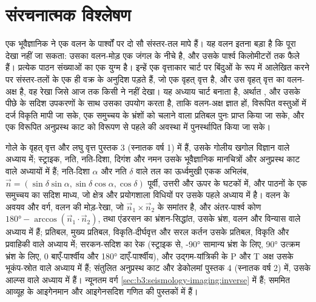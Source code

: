 \chapter{संरचनात्मक विश्लेषण}\label{ch:b3:structural-analysis}

एक भूवैज्ञानिक ने एक वलन के पार्श्वों पर दो सौ संस्तर-तल मापे हैं। यह वलन
इतना बड़ा है कि पूरा देखा नहीं जा सकता: उसका वलन-मोड़ एक जंगल के नीचे है, और
उसके पार्श्व किलोमीटरों तक फैले हैं। प्रत्येक पाठन संख्याओं का एक युग्म है। इन्हें एक वृत्ताकार चार्ट पर बिंदुओं के रूप में आलेखित करने पर
संस्तर-तलों के  एक ही वक्र के अनुदिश पड़ते हैं, जो एक वृहत् वृत्त है, और
उस वृहत् वृत्त का  वलन-अक्ष है, वह रेखा जिसे आज तक किसी ने नहीं देखा।
यह अध्याय चार्ट बनाता है, अर्थात , और
उसके पीछे के सदिश उपकरणों के साथ उसका उपयोग करता है, ताकि वलन-अक्ष ज्ञात हों, विरूपित वस्तुओं में दर्ज विकृति मापी जा सके,
एक समुच्चय के भ्रंशों को चलाने वाला प्रतिबल पुनः प्राप्त किया जा सके, और
एक विरूपित अनुप्रस्थ काट को विरूपण से पहले की अवस्था में
पुनर्स्थापित किया जा सके।

\begin{recall}
गोले के वृहत् वृत्त और लघु वृत्त पुस्तक 3 (स्नातक वर्ष 1) में हैं, उसके
गोलीय खगोल विज्ञान वाले अध्याय में; स्ट्राइक, नति, नति-दिशा, दिगंश और नमन उसके
भूवैज्ञानिक मानचित्रों और अनुप्रस्थ काट वाले अध्यायों में हैं; नति-दिशा $\alpha$ और नति $\delta$ वाले तल का ऊर्ध्वमुखी एकक अभिलंब,
$\vec n = (\sin\delta
\sin\alpha, \sin\delta\cos\alpha, \cos\delta)$ पूर्वी, उत्तरी और ऊपर के घटकों में, और
पाठनों के एक समुच्चय का सदिश माध्य, जो
क्षेत्र और प्रयोगशाला विधियों पर उसके पहले अध्याय में है। वलन के अवयव और वर्ग,
वलन की मोड़-रेखा, जो $\vec n_1\times\vec n_2$ के समांतर है, और अंतर-पार्श्व कोण
$\ang{180} - \arccos(\vec n_1\cdot\vec n_2)$, तथा एंडरसन का भ्रंशन-सिद्धांत, उसके
भ्रंश, वलन और विन्यास वाले अध्याय में हैं; प्रतिबल,
मुख्य प्रतिबल, विकृति-दीर्घवृत्त और सरल कर्तन उसके
प्रतिबल, विकृति और प्रवाहिकी वाले अध्याय में; सरकन-सदिश का रेक (स्ट्राइक से,
\ang{-90} सामान्य भ्रंश के लिए, \ang{90} उत्क्रम भ्रंश के लिए, 0 बाएँ-पार्श्वीय और
\ang{180} दाएँ-पार्श्वीय), और उद्गम-यांत्रिकी के P और T अक्ष उसके
भूकंप-स्रोत वाले अध्याय में हैं; संतुलित अनुप्रस्थ काट और डेकोलमां
पुस्तक 4 (स्नातक वर्ष 2) में, उसके आल्प्स वाले अध्याय में हैं। न्यूनतम वर्ग
\cref{sec:b3:seismology-imaging:inverse} में हैं; सममित आव्यूह के आइगेनमान और
आइगेनसदिश गणित की पुस्तकों में हैं।
\end{recall}

